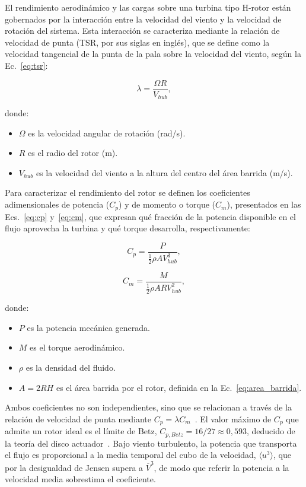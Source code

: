 El rendimiento aerodinámico y las cargas sobre una turbina tipo H-rotor están gobernados por la interacción entre la velocidad del viento y la velocidad de rotación del sistema. Esta interacción se caracteriza mediante la relación de velocidad de punta (TSR, por sus siglas en inglés), que se define como la velocidad tangencial de la punta de la pala sobre la velocidad del viento, según la Ec.~\ref{eq:tsr}:

\begin{equation}
    \lambda = \frac{\Omega R}{V_{hub}},
    \label{eq:tsr}
\end{equation}

donde:
\begin{itemize}
    \item $\Omega$ es la velocidad angular de rotación (rad/s).
    \item $R$ es el radio del rotor (m).
    \item $V_{hub}$ es la velocidad del viento a la altura del centro del área barrida (m/s).
\end{itemize}

Para caracterizar el rendimiento del rotor se definen los coeficientes adimensionales de potencia ($C_p$) y de momento o torque ($C_m$), presentados en las Ecs.~\ref{eq:cp} y~\ref{eq:cm}, que expresan qué fracción de la potencia disponible en el flujo aprovecha la turbina y qué torque desarrolla, respectivamente:

\begin{equation}
    C_p = \frac{P}{\frac{1}{2}\rho A V_{hub}^3},
    \label{eq:cp}
\end{equation}

\begin{equation}
    C_m = \frac{M}{\frac{1}{2}\rho A R V_{hub}^2},
    \label{eq:cm}
\end{equation}

donde:
\begin{itemize}
    \item $P$ es la potencia mecánica generada.
    \item $M$ es el torque aerodinámico.
    \item $\rho$ es la densidad del fluido.
    \item $A = 2RH$ es el área barrida por el rotor, definida en la Ec.~\ref{eq:area_barrida}.
\end{itemize}

Ambos coeficientes no son independientes, sino que se relacionan a través de la relación de velocidad de punta mediante $C_p = \lambda C_m$~\parencite{Essahraoui2026}. El valor máximo de $C_p$ que admite un rotor ideal es el límite de Betz, $C_{p,Betz} = 16/27 \approx 0{,}593$, deducido de la teoría del disco actuador~\parencite{Paraschivoiu2002}. Bajo viento turbulento, la potencia que transporta el flujo es proporcional a la media temporal del cubo de la velocidad, $\langle u^3 \rangle$, que por la desigualdad de Jensen supera a $\overline{V}^3$, de modo que referir la potencia a la velocidad media sobrestima el coeficiente.

